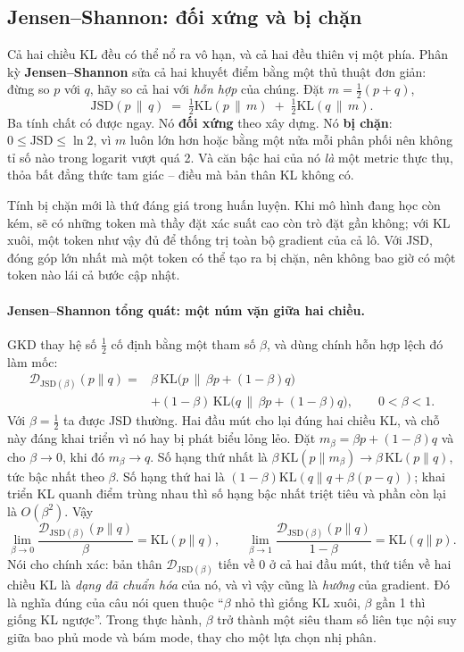 \subsection{Jensen--Shannon: đối xứng và bị chặn}
\label{ssec:jsd}

Cả hai chiều KL đều có thể nổ ra vô hạn, và cả hai đều thiên vị một phía. Phân kỳ \textbf{Jensen--Shannon} \cite{lin1991divergence} sửa cả hai khuyết điểm bằng một thủ thuật đơn giản: đừng so $p$ với $q$, hãy so cả hai với \emph{hỗn hợp} của chúng. Đặt $m = \tfrac12(p+q)$,
\[
\mathrm{JSD}(p \,\|\, q) \;=\; \tfrac12 \mathrm{KL}(p \,\|\, m) \;+\; \tfrac12 \mathrm{KL}(q \,\|\, m).
\]
Ba tính chất có được ngay. Nó \textbf{đối xứng} theo xây dựng. Nó \textbf{bị chặn}: $0 \le \mathrm{JSD} \le \ln 2$, vì $m$ luôn lớn hơn hoặc bằng một nửa mỗi phân phối nên không tỉ số nào trong logarit vượt quá 2. Và căn bậc hai của nó \emph{là} một metric thực thụ, thỏa bất đẳng thức tam giác -- điều mà bản thân KL không có.

Tính bị chặn mới là thứ đáng giá trong huấn luyện. Khi mô hình đang học còn kém, sẽ có những token mà thầy đặt xác suất cao còn trò đặt gần không; với KL xuôi, một token như vậy đủ để thống trị toàn bộ gradient của cả lô. Với JSD, đóng góp lớn nhất mà một token có thể tạo ra bị chặn, nên không bao giờ có một token nào lái cả bước cập nhật.

\paragraph{Jensen--Shannon tổng quát: một núm vặn giữa hai chiều.} GKD \cite{agarwal2024gkd} thay hệ số $\tfrac12$ cố định bằng một tham số $\beta$, và dùng chính hỗn hợp lệch đó làm mốc:
\[
\begin{aligned}
\mathcal{D}_{\mathrm{JSD}(\beta)}(p\|q) = {}& \beta\,\mathrm{KL}\big(p \,\big\|\, \beta p + (1-\beta)q\big)\\
&+ (1-\beta)\,\mathrm{KL}\big(q \,\big\|\, \beta p + (1-\beta)q\big),
\qquad 0 < \beta < 1 .
\end{aligned}
\]
Với $\beta = \tfrac12$ ta được JSD thường. Hai đầu mút cho lại đúng hai chiều KL, và chỗ này đáng khai triển vì nó hay bị phát biểu lỏng lẻo. Đặt $m_\beta = \beta p + (1-\beta)q$ và cho $\beta \to 0$, khi đó $m_\beta \to q$. Số hạng thứ nhất là $\beta\,\mathrm{KL}(p\|m_\beta) \to \beta\,\mathrm{KL}(p\|q)$, tức bậc nhất theo $\beta$. Số hạng thứ hai là $(1-\beta)\mathrm{KL}(q \| q + \beta(p-q))$; khai triển KL quanh điểm trùng nhau thì số hạng bậc nhất triệt tiêu và phần còn lại là $O(\beta^2)$. Vậy
\[
\lim_{\beta \to 0} \frac{\mathcal{D}_{\mathrm{JSD}(\beta)}(p\|q)}{\beta} = \mathrm{KL}(p\|q),
\qquad
\lim_{\beta \to 1} \frac{\mathcal{D}_{\mathrm{JSD}(\beta)}(p\|q)}{1-\beta} = \mathrm{KL}(q\|p).
\]
Nói cho chính xác: bản thân $\mathcal{D}_{\mathrm{JSD}(\beta)}$ tiến về 0 ở cả hai đầu mút, thứ tiến về hai chiều KL là \emph{dạng đã chuẩn hóa} của nó, và vì vậy cũng là \emph{hướng} của gradient. Đó là nghĩa đúng của câu nói quen thuộc ``$\beta$ nhỏ thì giống KL xuôi, $\beta$ gần 1 thì giống KL ngược''. Trong thực hành, $\beta$ trở thành một siêu tham số liên tục nội suy giữa bao phủ mode và bám mode, thay cho một lựa chọn nhị phân.

